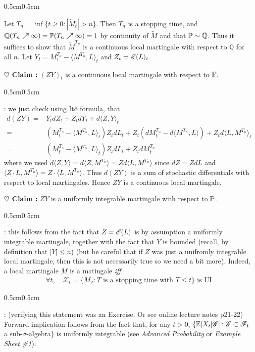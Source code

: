 \documentclass[12pt,a4paper]{article}
\newenvironment{proof}
{\begin{changemargin}{0.5cm}{0.5cm} 
	}%
	{\end{changemargin}
}
\newenvironment{subproof}
{\begin{changemargin}{0.5cm}{0.5cm} 
	}%
	{\end{changemargin}
}
\newenvironment{p}
{\begin{proof} 
	}%
	{\end{proof}
}
\begin{document}
\begin{p}
\pf Let $T_n = \inf \{t\geq 0 : |\tilde{M}_t| >n \}$. Then $T_n$ is a stopping time, and $\mathbb{Q}(T_n \nearrow \infty) = \mathbb{P} (T_n \nearrow \infty)=1$ by continuity of $\tilde{M}$ and that $\mathbb{P} \sim \mathbb{Q}$. Thus it suffices to show that $\tilde{M}^{T_n}$ is a continuous local martingale with respect to $\mathbb{Q}$ for all $n$. Let $Y_t = {M}_t^{T_n} - \langle M^{T_n} , L \rangle_t$ and $Z_t = \mathscr{E}(L)_t$.

\textbf{$\heartsuit$ Claim :} $(Z Y)_t$ is a continuous local martingale with respect to $\mathbb{P}$. 
\begin{subproof}
: we just check using It\^o formula, that
\begin{align*}
d(ZY) =& Y_t dZ_t + Z_t dY_t + d\langle Z, Y \rangle_t \\
=& (M_t^{T_n} - \langle M^{T_n}, L \rangle_t )Z_t dL_t + Z_t (dM_t^{T_n} - d\langle M^{T_n}, L \rangle) + Z_t d\langle L, M^{T_n} \rangle_t \\
= & (M_t^{T_n} - \langle M^{T_n}, L \rangle_t )Z_t dL_t + Z_t dM_t^{T_n}
\end{align*}
where we used $d \langle Z, Y \rangle = d\langle Z, M^{T_n} \rangle = Zd\langle L, M^{T_n} \rangle$ since $dZ= ZdL$ and $\langle Z\cdot L, M^{T_n} \rangle = Z\cdot \langle L, M^{T_n} \rangle$. Thus $d(ZY)$ is a sum of stochastic differentials with respect to local martingales. Hence $ZY$ is a continuous local martingale.
\end{subproof}

\textbf{$\heartsuit$ Claim :} $ZY$ is a uniformly integrable martingale with respect to $\mathbb{P}$.
\begin{subproof}
: this follows from the fact that $Z= \mathscr{E}(L)$ is by assumption a uniformly integrable martingale, together with the fact that $Y$ is bounded (recall, by definition that $|Y|\leq n$) (but be careful that if $Z$ was just a unifromly integrable local martingale, then this is not necessarily true so we need a bit more). Indeed, a local martingale $M$ is a matingale \emph{iff}
\begin{align*}
\forall t, \quad \mathscr{X}_t = \{ M_T : T\text{ is a stopping time with } T\leq t \} \text{ is UI}
\end{align*}
\begin{subproof}
: (verifying  this statement was an Exercise. Or see online lecture notes p21-22) Forward implication follows from the fact that, for any $t>0$, $\{ \mathbb{E}[X_t | \mathscr{G}] : \mathscr{G} \subset \mathscr{F}_t$ a sub-$\sigma$-algebra$\}$ is uniformly integrable (see \emph{Advanced Probability} or \emph{Example Sheet \#1}).


\end{subproof}
\end{subproof}
\end{p}
\end{document}
